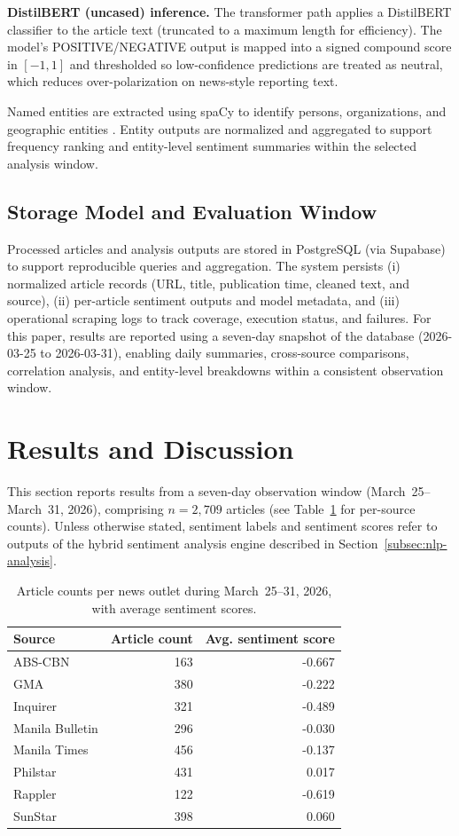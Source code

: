 \documentclass[sigconf, nonacm]{acmart}
\begin{document}
\textbf{DistilBERT (uncased) inference.} The transformer path applies a DistilBERT classifier to the article text (truncated to a maximum length for efficiency). The model’s POSITIVE/NEGATIVE output is mapped into a signed compound score in $[-1,1]$ and thresholded so low-confidence predictions are treated as neutral, which reduces over-polarization on news-style reporting text.

Named entities are extracted using spaCy \cite{spacy} to identify persons, organizations, and geographic entities \cite{nadeau2007ner}. Entity outputs are normalized and aggregated to support frequency ranking and entity-level sentiment summaries within the selected analysis window.


\subsection{Storage Model and Evaluation Window}
Processed articles and analysis outputs are stored in PostgreSQL (via Supabase) to support reproducible queries and aggregation. The system persists (i) normalized article records (URL, title, publication time, cleaned text, and source), (ii) per-article sentiment outputs and model metadata, and (iii) operational scraping logs to track coverage, execution status, and failures. For this paper, results are reported using a seven-day snapshot of the database (2026-03-25 to 2026-03-31), enabling daily summaries, cross-source comparisons, correlation analysis, and entity-level breakdowns within a consistent observation window.

\section{Results and Discussion}
This section reports results from a seven-day observation window (March~25--March~31, 2026), comprising $n=2{,}709$ articles (see Table~\ref{tab:per-source-counts} for per-source counts). Unless otherwise stated, sentiment labels and sentiment scores refer to outputs of the hybrid sentiment analysis engine described in Section~\ref{subsec:nlp-analysis}.

\begin{table}[h]
\centering
\small
\caption{Article counts per news outlet during March~25--31, 2026, with average sentiment scores.}
\label{tab:per-source-counts}
\begin{tabular}{lrr}
\toprule
Source & Article count & Avg. sentiment score \\
\midrule
ABS-CBN         & 163 & -0.667 \\
GMA             & 380 & -0.222 \\
Inquirer        & 321 & -0.489 \\
Manila Bulletin & 296 & -0.030 \\
Manila Times    & 456 & -0.137 \\
Philstar        & 431 & 0.017 \\
Rappler         & 122 & -0.619 \\
SunStar         & 398 & 0.060 \\
\bottomrule
\end{tabular}
\end{table}
\end{document}
